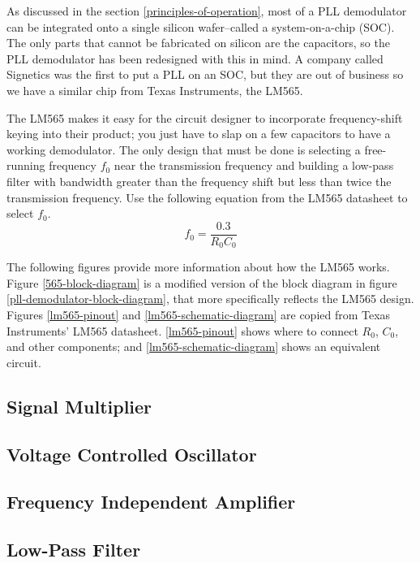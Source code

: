 \documentclass[titlepage, letterpaper, 10.5pt]{article}
\begin{document}
As discussed in the section \ref{principles-of-operation}, most of a PLL demodulator can be integrated onto a single silicon wafer--called a system-on-a-chip (SOC).
The only parts that cannot be fabricated on silicon are the capacitors, so the PLL demodulator has been redesigned with this in mind.
A company called Signetics was the first to put a PLL on an SOC, but they are out of business so we have a similar chip from Texas Instruments, the LM565.

The LM565 makes it easy for the circuit designer to incorporate frequency-shift keying into their product; you just have to slap on a few capacitors to have a working demodulator.
The only design that must be done is selecting a free-running frequency $f_{0}$ near the transmission frequency and building a low-pass filter with bandwidth greater than the frequency shift but less than twice the transmission frequency.
Use the following equation from the LM565 datasheet to select $f_{0}$.
\begin{equation}
f_{0}=\frac{0.3}{R_{0}C_{0}}
\label{f0-eq}
\end{equation}

The following figures provide more information about how the LM565 works.
Figure \ref{565-block-diagram} is a modified version of the block diagram in figure \ref{pll-demodulator-block-diagram}, that more specifically reflects the LM565 design.
Figures \ref{lm565-pinout} and \ref{lm565-schematic-diagram} are copied from Texas Instruments' LM565 datasheet.
\ref{lm565-pinout} shows where to connect $R_{0}$, $C_{0}$, and other components; and \ref{lm565-schematic-diagram} shows an equivalent circuit.


\subsection{Signal Multiplier}

\subsection{Voltage Controlled Oscillator}

\subsection{Frequency Independent Amplifier}

\subsection{Low-Pass Filter}
\end{document}
